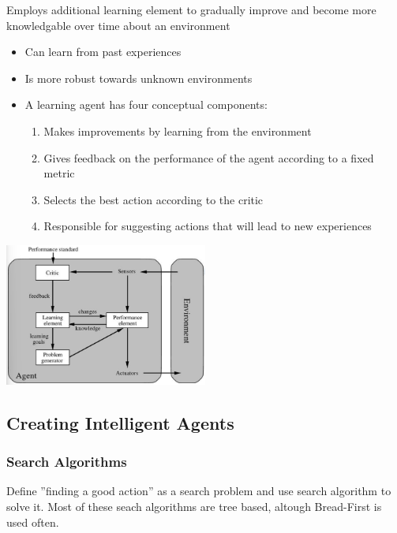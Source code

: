 \documentclass[
../../EiKI_Summary.tex,
]
{subfiles}
\begin{document}
\begin{defbox}
    Employs additional learning element to gradually improve and become more knowledgable over time about an environment
    \begin{itemize}
        \item Can learn from past experiences
        \item Is more robust towards unknown environments
        \item A learning agent has four conceptual components:
        \begin{enumerate}
            \item {} Makes improvements by learning from the environment
            \item {} Gives feedback on the performance of the agent according to a fixed metric
            \item {} Selects the best action according to the critic
            \item {} Responsible for suggesting actions that will lead to new experiences
        \end{enumerate}
    \end{itemize}

    \begin{center}
        \includegraphics[width=0.5\textwidth]{Pics/LearningAgent.png}
    \end{center}
\end{defbox}

\subsection{Creating Intelligent Agents}

\subsubsection{Search Algorithms}
Define ''finding a good action'' as a search problem and use search algorithm to solve it. Most of these seach algorithms are tree based, altough Bread-First is used often.
\end{document}
